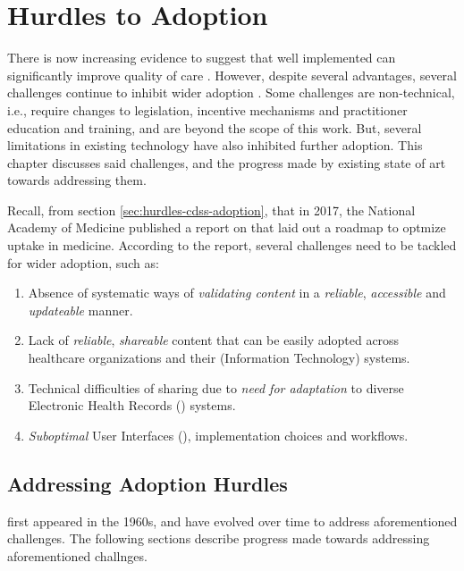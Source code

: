 \chapter{Hurdles to \CDSS{} Adoption}\label{chapter:hurdles-cdss-adoption}

There is now increasing evidence to suggest that
well implemented \CDSSs{} can significantly improve quality of care
\cite{GargJAMA05,WellsEJPC08}. However, despite several advantages,
several challenges continue to inhibit wider \CDSS{} adoption \cite{Nam17}.
Some challenges are non-technical, i.e., require changes to legislation,
incentive mechanisms and practitioner education and training, and are beyond the
scope of this work. But, several limitations in existing \CDSS{} technology have also
inhibited further adoption. This chapter discusses said challenges, and
the progress made by existing state of art towards addressing them.

Recall, from section \ref{sec:hurdles-cdss-adoption}, that in 2017,
the National Academy of Medicine published a report on \CDSSs{} that
laid out a roadmap to optmize \CDSS{} uptake in medicine. According to the
report, several challenges need to be tackled for wider adoption, such as:


\begin{enumerate}[label=C\arabic*.]
\itemsep0.0em
\item Absence of systematic ways of \emph{validating content}
in a \emph{reliable}, \emph{accessible} and \emph{updateable} manner.
\item Lack of \emph{reliable}, \emph{shareable} \CDSS{} content
that can be easily adopted across healthcare organizations and their (Information
Technology) \IT{} systems.
\item Technical difficulties of sharing due to \emph{need for
  adaptation} to diverse Electronic Health Records (\EHR) systems.
\item \emph{Suboptimal} User Interfaces (\UIs), implementation choices and
workflows.
\end{enumerate}

\section{Addressing Adoption Hurdles}

\CDSS{} first appeared in the 1960s, and have evolved over time
to address aforementioned challenges. The following sections
describe progress made towards addressing aforementioned challnges.

